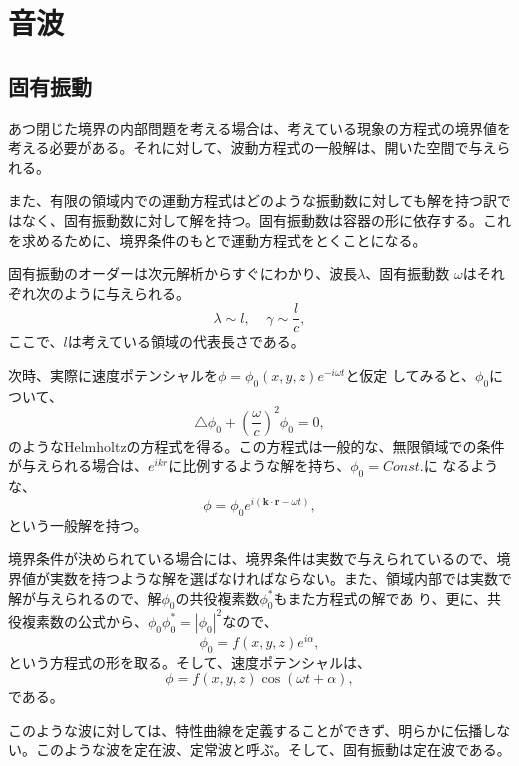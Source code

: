 \section{音波}
\subsection{固有振動}
あつ閉じた境界の内部問題を考える場合は、考えている現象の方程式の境界値を
考える必要がある。それに対して、波動方程式の一般解は、開いた空間で与えら
れる。

また、有限の領域内での運動方程式はどのような振動数に対しても解を持つ訳で
はなく、固有振動数に対して解を持つ。固有振動数は容器の形に依存する。これ
を求めるために、境界条件のもとで運動方程式をとくことになる。

固有振動のオーダーは次元解析からすぐにわかり、波長$\lambda$、固有振動数
$\omega$はそれぞれ次のように与えられる。
\begin{equation}
 \lambda \sim l, \mspace{20mu}\gamma \sim \frac{l}{c},
\end{equation}
ここで、$l$は考えている領域の代表長さである。

次時、実際に速度ポテンシャルを$\phi = \phi_0(x,y,z)e^{-i\omega t}$と仮定
してみると、$\phi_0$について、
\begin{equation}
 \triangle \phi_0 + \left(\frac{\omega}{c}\right)^2\phi_0 = 0,
\end{equation}
のようなHelmholtzの方程式を得る。この方程式は一般的な、無限領域での条件
が与えられる場合は、$e^{ikr}$に比例するような解を持ち、$\phi_0=Const.$に
なるような、
\begin{equation}
 \phi = \phi_0 e^{i(\bm{k}\cdot\bm{r}-\omega t)},
\end{equation}
という一般解を持つ。

境界条件が決められている場合には、境界条件は実数で与えられているので、境
界値が実数を持つような解を選ばなければならない。また、領域内部では実数で
解が与えられるので、解$\phi_0$の共役複素数$\phi_0^*$もまた方程式の解であ
り、更に、共役複素数の公式から、$\phi_0\phi_0^*=|\phi_0|^2$なので、
\begin{equation}
 \phi_0 = f(x,y,z)e^{i\alpha},
\end{equation}
という方程式の形を取る。そして、速度ポテンシャルは、
\begin{equation}
 \phi = f(x,y,z)\cos (\omega t + \alpha),
\end{equation}
である。

このような波に対しては、特性曲線を定義することができず、明らかに伝播しな
い。このような波を定在波、定常波と呼ぶ。そして、固有振動は定在波である。

